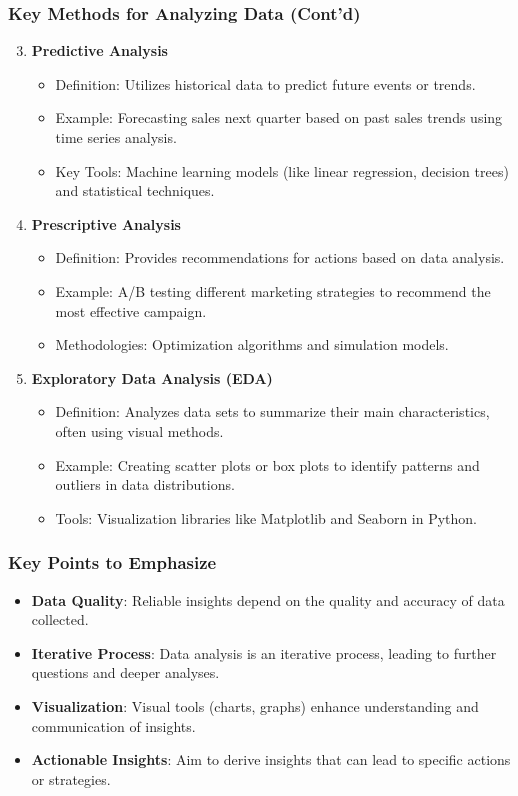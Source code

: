 \documentclass[aspectratio=169]{beamer}
\begin{document}
\begin{frame}
    \frametitle{Key Methods for Analyzing Data (Cont'd)}
    \begin{enumerate}
        \setcounter{enumi}{2}
        \item \textbf{Predictive Analysis}
            \begin{itemize}
                \item Definition: Utilizes historical data to predict future events or trends.
                \item Example: Forecasting sales next quarter based on past sales trends using time series analysis.
                \item Key Tools: Machine learning models (like linear regression, decision trees) and statistical techniques.
            \end{itemize}
        \item \textbf{Prescriptive Analysis}
            \begin{itemize}
                \item Definition: Provides recommendations for actions based on data analysis.
                \item Example: A/B testing different marketing strategies to recommend the most effective campaign.
                \item Methodologies: Optimization algorithms and simulation models.
            \end{itemize}
        \item \textbf{Exploratory Data Analysis (EDA)}
            \begin{itemize}
                \item Definition: Analyzes data sets to summarize their main characteristics, often using visual methods.
                \item Example: Creating scatter plots or box plots to identify patterns and outliers in data distributions.
                \item Tools: Visualization libraries like Matplotlib and Seaborn in Python.
            \end{itemize}
    \end{enumerate}
\end{frame}

\begin{frame}
    \frametitle{Key Points to Emphasize}
    \begin{itemize}
        \item \textbf{Data Quality}: Reliable insights depend on the quality and accuracy of data collected.
        \item \textbf{Iterative Process}: Data analysis is an iterative process, leading to further questions and deeper analyses.
        \item \textbf{Visualization}: Visual tools (charts, graphs) enhance understanding and communication of insights.
        \item \textbf{Actionable Insights}: Aim to derive insights that can lead to specific actions or strategies.
    \end{itemize}
\end{frame}
\end{document}
